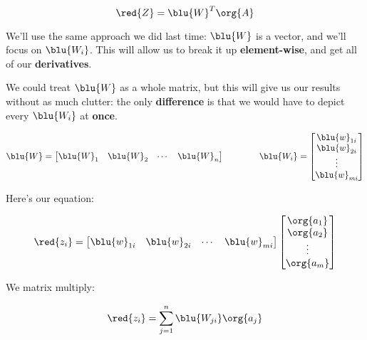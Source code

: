         \begin{equation}
            \red{Z} = \blu{W}^T\org{A}
        \end{equation}
        
        We'll use the same approach we did last time: $\blu{W}$ is a vector, and we'll focus on $\blu{W_i}$. This will allow us to break it up \textbf{element-wise}, and get all of our \textbf{derivatives}.
        
        We could treat $\blu{W}$ as a whole matrix, but this will give us our results without as much clutter: the only \textbf{difference} is that we would have to depict every $\blu{W_i}$ at \textbf{once}.
        
        \begin{equation}
            \blu{W}
            =
            \begin{bmatrix}
                \blu{W}_1 & \blu{W}_2 & \cdots & \blu{W}_n
            \end{bmatrix}
            \qquad\qquad
            \blu{W_i} = 
            \begin{bmatrix}
                \blu{w}_{1i} \\ \blu{w}_{2i} \\ \vdots \\ \blu{w}_{mi}
            \end{bmatrix}
        \end{equation}
        
        Here's our equation:
        
        \begin{equation}
            \red{z_i} 
            =
            \begin{bmatrix}
                \blu{w}_{1i} & \blu{w}_{2i} & \cdots & \blu{w}_{mi}
            \end{bmatrix}
            \begin{bmatrix}
                \org{a_1}\\\org{a_2}\\ \vdots \\ \org{a_m}
            \end{bmatrix}
        \end{equation}
        
        We matrix multiply:
        
        \begin{equation}
            \red{z_i} 
            =
            \sum_{j=1}^n
            \blu{W_{ji} }\org{a_j}
        \end{equation}
        

